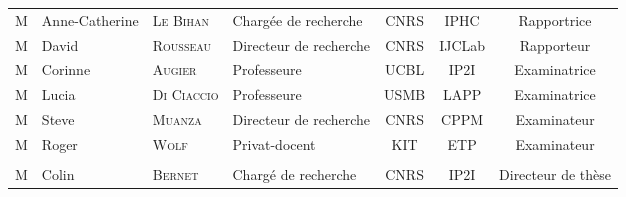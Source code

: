 {\small

\begin{tabular}{llllccc}
M\up{me}\!\!\!\! & Anne-Catherine \!\! & \textsc{Le Bihan} & Chargée de recherche & CNRS & IPHC & Rapportrice\\
M & David & \textsc{Rousseau} & Directeur de recherche & CNRS & IJCLab & Rapporteur\\
M\up{me}\!\!\!\! & Corinne & \textsc{Augier} & Professeure & UCBL & IP2I & Examinatrice\\
M\up{me}\!\!\!\! & Lucia & \textsc{Di Ciaccio} & Professeure & USMB & LAPP & Examinatrice\\
M & Steve & \textsc{Muanza} & Directeur de recherche & CNRS & CPPM & Examinateur\\
M & Roger & \textsc{Wolf} & Privat-docent & KIT  & ETP & Examinateur\\
\\
M & Colin & \textsc{Bernet} & Chargé de recherche & CNRS & IP2I & Directeur de thèse \\
\end{tabular}

}
